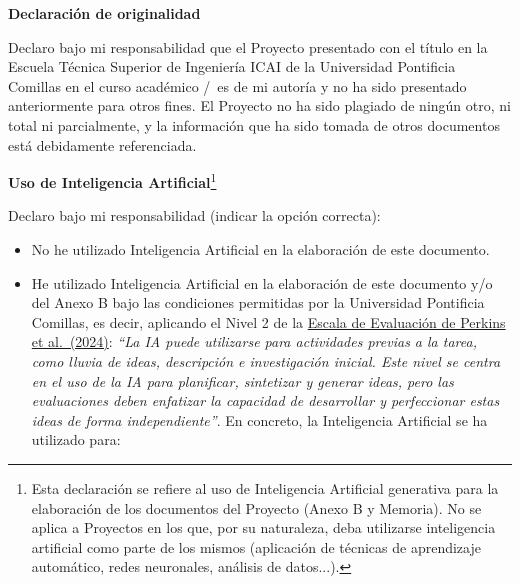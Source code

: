 \documentclass[TFG_spanish.tex]{subfiles}
\begin{document}
\clearpage
\thispagestyle{empty}

\begin{center}
    \large \textbf{Declaración de originalidad}
\end{center}

{\fontsize{11}{15}\selectfont

    Declaro bajo mi responsabilidad que el Proyecto presentado con el título \textbf{\projectTitle} en la Escuela Técnica Superior de Ingeniería ICAI de la Universidad Pontificia Comillas en el curso académico \BeginYear/\EndYear\ es de mi autoría y no ha sido presentado anteriormente para otros fines. El Proyecto no ha sido plagiado de ningún otro, ni total ni parcialmente, y la información que ha sido tomada de otros documentos está debidamente referenciada.

    \vspace{5mm}

    \begin{center}
        {\large \textbf{Uso de Inteligencia Artificial}}\footnote{Esta declaración se refiere al uso de Inteligencia Artificial generativa para la elaboración de los documentos del Proyecto (Anexo B y Memoria). No se aplica a Proyectos en los que, por su naturaleza, deba utilizarse inteligencia artificial como parte de los mismos (aplicación de técnicas de aprendizaje automático, redes neuronales, análisis de datos...).}
    \end{center}

     Declaro bajo mi responsabilidad (indicar la opción correcta):

    \begin{itemize}
        \item[$\square$] %
        No he utilizado Inteligencia Artificial en la elaboración de este documento.

        \item[$\boxtimes$] %
        He utilizado Inteligencia Artificial en la elaboración de este documento y/o del Anexo B bajo las condiciones permitidas por la Universidad Pontificia Comillas, es decir, aplicando el Nivel 2 de la \href{https://aiassessmentscale.com/}{Escala de Evaluación de Perkins et al.\ (2024)}: \emph{``La IA puede utilizarse para actividades previas a la tarea, como lluvia de ideas, descripción e investigación inicial. Este nivel se centra en el uso de la IA para planificar, sintetizar y generar ideas, pero las evaluaciones deben enfatizar la capacidad de desarrollar y perfeccionar estas ideas de forma independiente''}. En concreto, la Inteligencia Artificial se ha utilizado para:
    \end{itemize}

}
\end{document}
